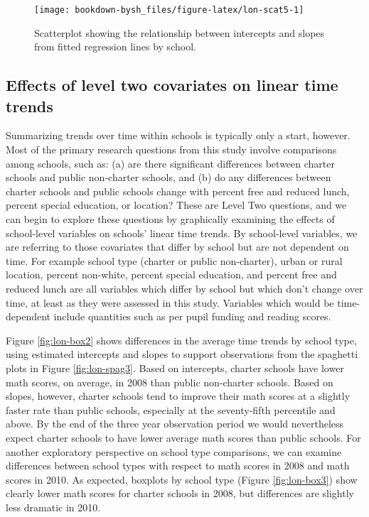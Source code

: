 \documentclass[
]{krantz}
\begin{document}
\begin{figure}

{\centering \texttt{[image: bookdown-bysh\_files/figure-latex/lon-scat5-1]} 

}

\caption{Scatterplot showing the relationship between intercepts and slopes from fitted regression lines by school.}\label{fig:lon-scat5}
\end{figure}

\hypertarget{lineartwostageL2effects}{%
\subsection{Effects of level two covariates on linear time trends}\label{lineartwostageL2effects}}

Summarizing trends over time within schools is typically only a start, however. Most of the primary research questions from this study involve comparisons among schools, such as: (a) are there significant differences between charter schools and public non-charter schools, and (b) do any differences between charter schools and public schools change with percent free and reduced lunch, percent special education, or location? These are Level Two questions, and we can begin to explore these questions by graphically examining the effects of school-level variables on schools' linear time trends. By school-level variables, we are referring to those covariates that differ by school but are not dependent on time. For example school type (charter or public non-charter), urban or rural location, percent non-white, percent special education, and percent free and reduced lunch are all variables which differ by school but which don't change over time, at least as they were assessed in this study. Variables which would be time-dependent include quantities such as per pupil funding and reading scores.

Figure \ref{fig:lon-box2} shows differences in the average time trends by school type, using estimated intercepts and slopes to support observations from the spaghetti plots in Figure \ref{fig:lon-spag3}. Based on intercepts, charter schools have lower math scores, on average, in 2008 than public non-charter schools. Based on slopes, however, charter schools tend to improve their math scores at a slightly faster rate than public schools, especially at the seventy-fifth percentile and above. By the end of the three year observation period we would nevertheless expect charter schools to have lower average math scores than public schools. For another exploratory perspective on school type comparisons, we can examine differences between school types with respect to math scores in 2008 and math scores in 2010. As expected, boxplots by school type (Figure \ref{fig:lon-box3}) show clearly lower math scores for charter schools in 2008, but differences are slightly less dramatic in 2010.
\end{document}
